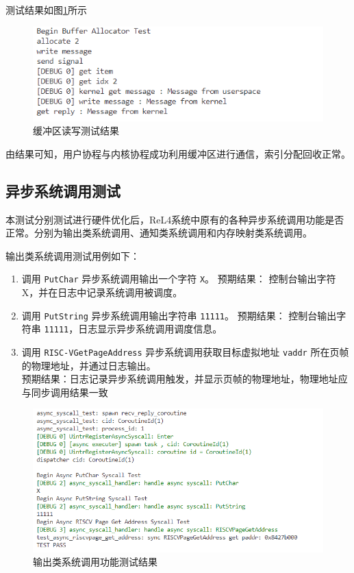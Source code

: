 测试结果如图\ref*{buffertest}所示

\begin{figure}[htbp]
  \centering
  \includegraphics[width=\textwidth]{images/buffertest.png}
  \caption{缓冲区读写测试结果}\label{buffertest}
\end{figure}

由结果可知，用户协程与内核协程成功利用缓冲区进行通信，索引分配回收正常。

\subsection{异步系统调用测试}

本测试分别测试进行硬件优化后，ReL4系统中原有的各种异步系统调用功能是否正常。分别为输出类系统调用、通知类系统调用和内存映射类系统调用。

输出类系统调用测试用例如下：

\begin{enumerate}
  \item 调用 \texttt{PutChar} 异步系统调用输出一个字符 \texttt{X}。
        预期结果： 控制台输出字符X，并在日志中记录系统调用被调度。

  \item 调用 \texttt{PutString} 异步系统调用输出字符串 \texttt{11111}。
        预期结果： 控制台输出字符串 \texttt{11111}，日志显示异步系统调用调度信息。
  \item 调用 \texttt{RISC-VGetPageAddress} 异步系统调用获取目标虚拟地址 \texttt{vaddr} 所在页帧的物理地址，并通过日志输出。\\
        预期结果：日志记录异步系统调用触发，并显示页帧的物理地址，物理地址应与同步调用结果一致
\end{enumerate}

\begin{figure}[htbp]
  \centering
  \includegraphics[width=\textwidth]{images/output_test.png}
  \caption{输出类系统调用功能测试结果}\label{outputtest}
\end{figure}


